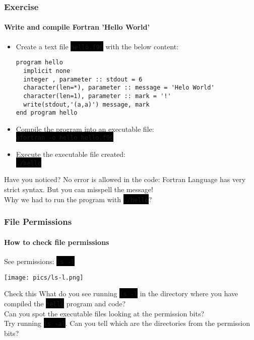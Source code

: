 \documentclass[unknownkeysallowed, 10pt, a4 paper, handout]{beamer}
\newcommand{\code}[1]{\colorbox{black}{\color{green}\texttt{#1}}}
\newcommand{\sidebyside}[5]{
  \begin{minipage}{#1\textwidth}
    #2
  \end{minipage} #3 \begin{minipage}{#4\textwidth}
    #5
  \end{minipage}
}
\begin{document}
\begin{frame}[label=exercise1, fragile=singleslide]
  \frametitle{Exercise}
  \framesubtitle{Write and compile Fortran 'Hello World'}
  \begin{itemize}
    \item Create a text file \code{hello.f90} with the below content:
      \footnotesize{
      \begin{verbatim}
program hello
  implicit none
  integer , parameter :: stdout = 6
  character(len=*), parameter :: message = 'Helo World'
  character(len=1), parameter :: mark = '!'
  write(stdout,'(a,a)') message, mark
end program hello
      \end{verbatim}
      }
    \item Compile the program into an executable file: \\
      \code{gfortran -o hello hello.f90}
    \item Execute the executable file created: \\
      \code{./hello}
  \end{itemize}
    \begin{alertblock}{Have you noticed?}
      No error is allowed in the code: Fortran Language has very
        strict syntax. But you can misspell the message! \\
      Why we had to run the program with \code{./hello}?
    \end{alertblock}
\end{frame}


\begin{frame}
  \begin{center}
    \frametitle{File Permissions}
    \framesubtitle{How to check file permissions}

    \sidebyside{0.44}{
      \centering
      See permissions: \code{ls -l}
    }{\hfill}{0.52}{
      \begin{center}
        \texttt{[image: pics/ls-l.png]}
      \end{center}
    }
    \begin{alertblock}{Check this}
      What do you see running \code{ls -l} in the directory where you
        have compiled the \code{hello} program and code? \\
      Can you spot the executable files looking at the permission bits? \\
      Try running \code{ls -al}. Can you tell which are the directories
        from the permission bits?
    \end{alertblock}

  \end{center}
\end{frame}
\end{document}
